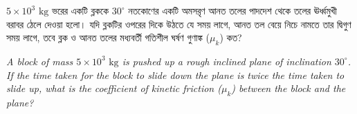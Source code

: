 \documentclass[12pt, a4paper]{article}
\begin{document}

\begin{tcolorbox}[questionbox={প্রশ্ন (Question) 10}]
\noindent
$5 \times 10^3\text{ kg}$ ভরের একটি ব্লককে $30^\circ$ নতকোণের একটি অমসরৃণ আনত তলের পাদদেশ থেকে তলের ঊর্ধ্বমুখী বরাবর ঠেলে দেওয়া হলো। যদি ব্লকটির ওপরের দিকে উঠতে যে সময় লাগে, আনত তল বেয়ে নিচে নামতে তার দ্বিগুণ সময় লাগে, তবে ব্লক ও আনত তলের মধ্যবর্তী গতিশীল ঘর্ষণ গুণাঙ্ক ($\mu_k$) কত?

\vspace{0.8em}
\begin{english}
\noindent\textit{\color{darkgray}
A block of mass $5 \times 10^3\text{ kg}$ is pushed up a rough inclined plane of inclination $30^\circ$. If the time taken for the block to slide down the plane is twice the time taken to slide up, what is the coefficient of kinetic friction ($\mu_k$) between the block and the plane?
}
\end{english}
\end{tcolorbox}
\end{document}
